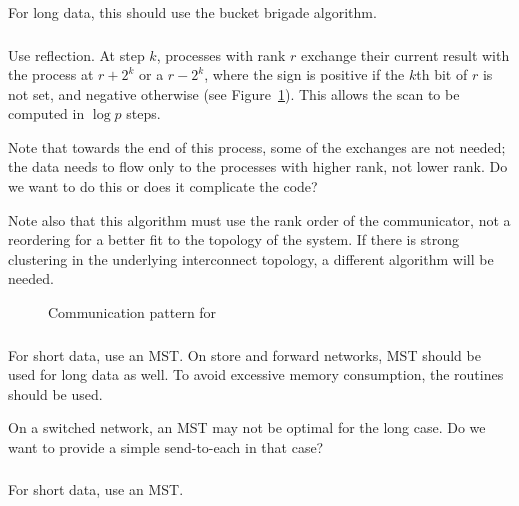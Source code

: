 \documentclass{article}
\begin{document}
For long data, this should use the bucket brigade algorithm.

\subsubsection{}
Use reflection.  At step $k$, processes with rank $r$ exchange their current
result with the process at $r+2^k$ or a $r-2^k$, where the sign is positive if
the $k$th bit of $r$ is not set, and negative otherwise (see
Figure~\ref{fig:scan-pattern}).  This allows the scan 
to be computed in $\log p$ steps.  

Note that towards the end of this process, some of the exchanges are not
needed; the data needs to flow only to the processes with higher rank, not
lower rank.  Do we want to do this or does it complicate the code?

Note also that this algorithm must use the rank order of the communicator, not
a reordering for a better fit to the topology of the system.  If there is
strong clustering in the underlying interconnect topology, a different
algorithm will be needed.

\begin{figure}
\centerline{}
\caption{Communication pattern for }\label{fig:scan-pattern}
\end{figure}

\subsubsection{}
For short data, use an MST. On store and forward networks, MST should be used
for long data as well.  To avoid excessive memory consumption, the
 routines should be used.

On a switched network, an MST may not be optimal for the long case.  Do we
want to provide a simple send-to-each in that case?

\subsubsection{}
For short data, use an MST. 
\end{document}
